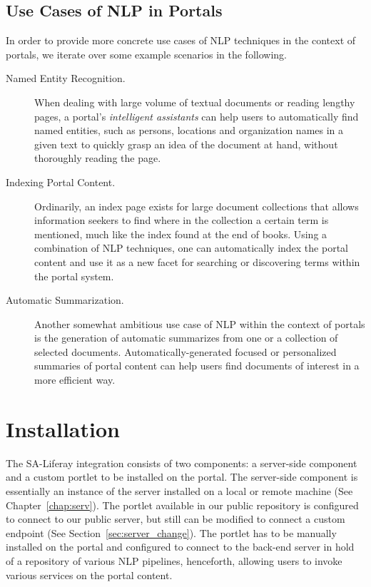\subsection{Use Cases of NLP in Portals}
In order to provide more concrete use cases of NLP techniques in the context of portals, we iterate over some example scenarios in the following.

\begin{description}
\item[Named Entity Recognition.] When dealing with large volume of textual documents or reading lengthy pages, a portal's \emph{intelligent assistants} can help users to automatically find named entities, such as persons, locations and organization names in a given text to quickly grasp an idea of the document at hand, without thoroughly reading the page. 
\item[Indexing Portal Content.] Ordinarily, an index page exists for large document collections that allows information seekers to find where in the collection a certain term is mentioned, much like the index found at the end of books. Using a combination of NLP techniques, one can automatically index the portal content and use it as a new facet for searching or discovering terms within the portal system.
\item[Automatic Summarization.] Another somewhat ambitious use case of NLP within the context of portals is the generation of automatic summarizes from one or a collection of selected documents. Automatically-generated focused or personalized summaries of portal content can help users find documents of interest in a more efficient way.
\end{description}

\noindent

\section{Installation}
The SA-Liferay integration consists of two components: a server-side component and a custom portlet to be installed on the portal. The server-side component is essentially an instance of the \sa server installed on a local or remote machine (See Chapter~\ref{chap:serv}). The \sa portlet available in our public repository is configured to connect to our public \sa server, but still can be modified to connect a custom endpoint (See Section~\ref{sec:server_change}). The \sa portlet has to be manually installed on the portal and configured to connect to the back-end \sa server in hold of a repository of various NLP pipelines, henceforth, allowing users to invoke various services on the portal content. 

